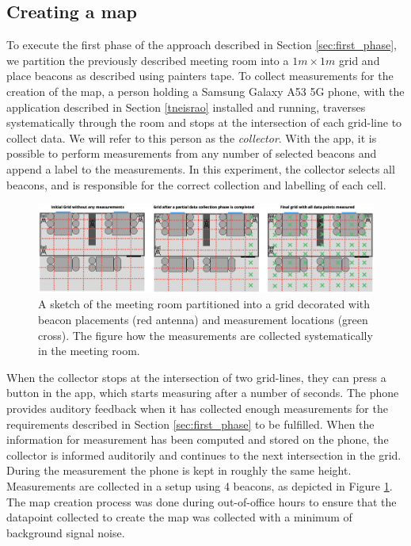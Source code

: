 \subsection{Creating a map}
To execute the first phase of the approach described in Section \ref{sec:first_phase},  we partition the previously described meeting room into a $1m \times 1m$ grid and place beacons as described using painters tape.%
To collect measurements for the creation of the map, a person holding a Samsung Galaxy A53 5G phone, with the application described in Section \ref{tneisrao} installed and running, traverses systematically through the room and stops at the intersection of each grid-line to collect data. 
We will refer to this person as the \textit{collector}.
With the app, it is possible to perform measurements from any number of selected beacons and append a label to the measurements.
In this experiment, the collector selects all beacons, and is responsible for the correct collection and labelling of each cell.
\begin{figure}[h]
    \centering
    \includegraphics[width=\textwidth]{images/experiment_map_creation.png}
    \caption{A sketch of the meeting room partitioned into a grid decorated with beacon placements (red antenna) and measurement locations (green cross). The figure how the measurements are collected systematically in the meeting room.}
    \label{fig:experiment_map_creation}
\end{figure}
When the collector stops at the intersection of two grid-lines, they can press a button in the app, which starts measuring after a number of seconds.
The phone provides auditory feedback when it has collected enough measurements for the requirements described in Section \ref{sec:first_phase} to be fulfilled.
When the information for measurement has been computed and stored on the phone, the collector is informed auditorily and continues to the next intersection in the grid. 
During the measurement the phone is kept in roughly the same height.
Measurements are collected in a setup using 4 beacons, as depicted in Figure \ref{fig:experiment_map_creation}.
The map creation process was done during out-of-office hours to ensure that the datapoint collected to create the map was collected with a minimum of background signal noise.  

